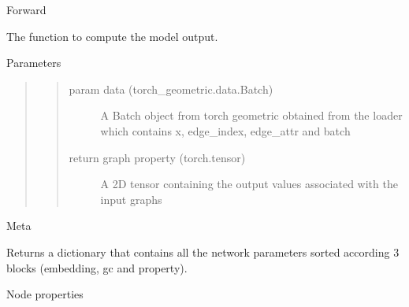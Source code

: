 \documentclass[letterpaper,10pt,english]{sphinxmanual}
\begin{document}
\begin{fulllineitems}
\begin{fulllineitems}
\label{\detokenize{modules/gqcml.torchgeom_interface:gqcml.torchgeom_interface.models_3.GCNConv.forward}}
Forward

The function to compute the model output.

Parameters
\begin{quote}
\begin{quote}\begin{description}
\item[{param data (torch\_geometric.data.Batch)}] \leavevmode
A Batch object from torch geometric obtained from the loader
which contains x, edge\_index, edge\_attr and batch

\item[{return graph property (torch.tensor)}] \leavevmode
A 2D tensor containing the output values associated with the input graphs

\end{description}\end{quote}
\end{quote}

\end{fulllineitems}


\begin{fulllineitems}
\label{\detokenize{modules/gqcml.torchgeom_interface:gqcml.torchgeom_interface.models_3.GCNConv.meta}}
Meta

Returns a dictionary that contains all the network parameters sorted according 3
blocks (embedding, gc and property).

\end{fulllineitems}


\begin{fulllineitems}
\label{\detokenize{modules/gqcml.torchgeom_interface:gqcml.torchgeom_interface.models_3.GCNConv.node_properties}}
Node properties


\end{fulllineitems}
\end{fulllineitems}
\end{document}
